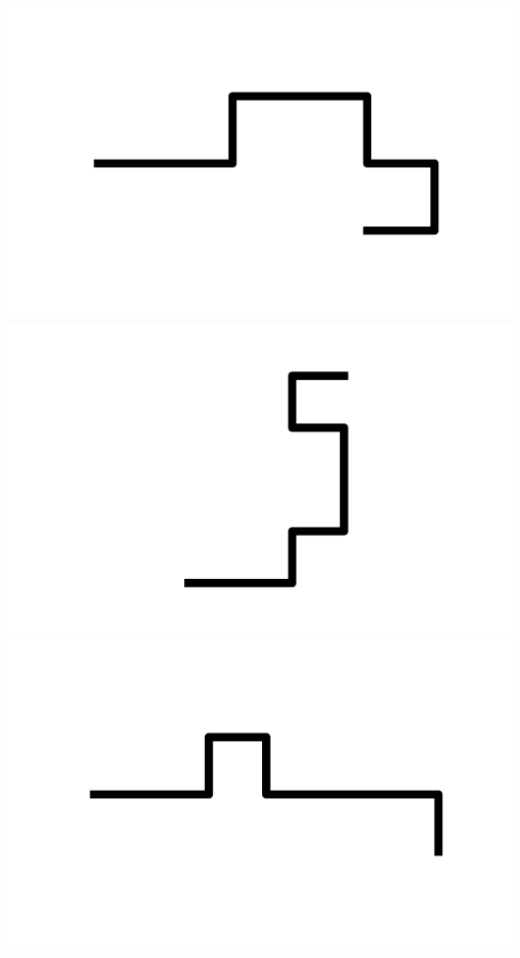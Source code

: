 \documentclass[]{report}
\begin{document}
\includegraphics[scale=.1]{pictures/21/state_cluster_shapes_445.pdf} 
\includegraphics[scale=.1]{pictures/21/state_cluster_shapes_446.pdf} 
\includegraphics[scale=.1]{pictures/21/state_cluster_shapes_447.pdf} 
\end{document}
